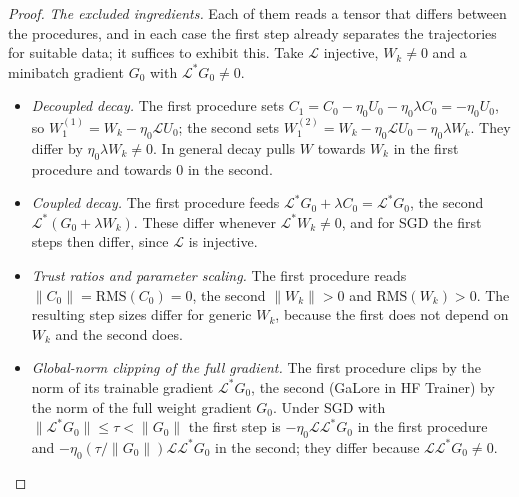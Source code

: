 \begin{proof}
\emph{The excluded ingredients.} Each of them reads a tensor that differs between the procedures, and in each case the
first step already separates the trajectories for suitable data; it suffices to exhibit this. Take $\mathcal L$ injective,
$W_k\ne0$ and a minibatch gradient $G_0$ with $\mathcal L^*G_0\ne0$.
\begin{itemize}
  \item \emph{Decoupled decay.} The first procedure sets $C_1=C_0-\eta_0U_0-\eta_0\lambda C_0=-\eta_0U_0$, so
  $W^{(1)}_1=W_k-\eta_0\mathcal LU_0$; the second sets $W^{(2)}_1=W_k-\eta_0\mathcal LU_0-\eta_0\lambda W_k$. They differ by
  $\eta_0\lambda W_k\ne0$. In general decay pulls $W$ towards $W_k$ in the first procedure and towards $0$ in the second.
  \item \emph{Coupled decay.} The first procedure feeds $\mathcal L^*G_0+\lambda C_0=\mathcal L^*G_0$, the second
  $\mathcal L^*(G_0+\lambda W_k)$. These differ whenever $\mathcal L^*W_k\ne0$, and for SGD the first steps then differ,
  since $\mathcal L$ is injective.
  \item \emph{Trust ratios and parameter scaling.} The first procedure reads $\lVert C_0\rVert=\mathrm{RMS}(C_0)=0$, the
  second $\lVert W_k\rVert>0$ and $\mathrm{RMS}(W_k)>0$. The resulting step sizes differ for generic $W_k$, because the
  first does not depend on $W_k$ and the second does.
  \item \emph{Global-norm clipping of the full gradient.} The first procedure clips by the norm of its trainable gradient
  $\mathcal L^*G_0$, the second (GaLore in HF Trainer) by the norm of the full weight gradient $G_0$. Under SGD with
  $\lVert\mathcal L^*G_0\rVert\le\tau<\lVert G_0\rVert$ the first step is $-\eta_0\mathcal L\mathcal L^*G_0$ in the first
  procedure and $-\eta_0(\tau/\lVert G_0\rVert)\mathcal L\mathcal L^*G_0$ in the second; they differ because
  $\mathcal L\mathcal L^*G_0\ne0$.
\end{itemize}


\end{proof}
